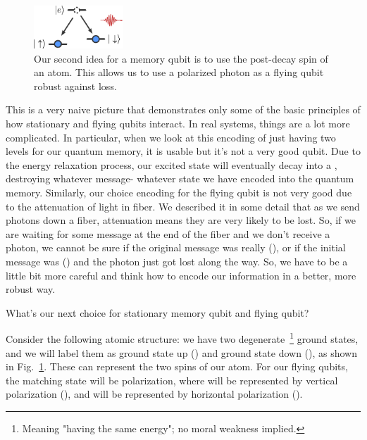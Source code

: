 
\begin{figure}[t]
    \centering
    \includegraphics[width=0.3\textwidth]{lesson13/13-4_memory-second.pdf}
    \caption[Our second idea for memory]{Our second idea for a memory qubit is to use the post-decay spin of an atom. This allows us to use a polarized photon as a flying qubit robust against loss.}
    \label{fig:13-memory-second-idea}
\end{figure}

This is a very naive picture that demonstrates only some of the basic principles of how stationary and flying qubits interact. In real systems, things are a lot more complicated. In particular, when we look at this encoding of just having two levels for our quantum memory, it is usable but it's not a very good qubit. Due to the energy relaxation process, our excited state will eventually decay into a , destroying whatever message- whatever state we have encoded into the quantum memory. Similarly, our choice encoding for the flying qubit is not very good due to the attenuation of light in fiber. We described it in some detail that as we send photons down a fiber, attenuation means they are very likely to be lost. So, if we are waiting for some message at the end of the fiber and we don't receive a photon, we cannot be sure if the original message was really  (), or if the initial message was  () and the photon just got lost along the way. So, we have to be a little bit more careful and think how to encode our information in a better, more robust way.

What's our next choice for stationary memory qubit and flying qubit?

Consider the following atomic structure: we have two degenerate~\footnote{Meaning "having the same energy"; no moral weakness implied.} ground states, and we will label them as ground state up (\ket{\uparrow}) and ground state down (\ket{\downarrow}), as shown in Fig.~\ref{fig:13-memory-second-idea}. These can represent the two spins of our atom.
For our flying qubits, the matching state will be polarization, where  will be represented by vertical polarization (), and  will be represented by horizontal polarization (). 

